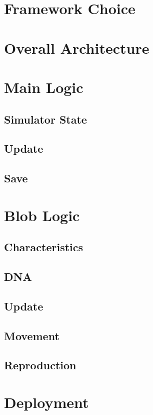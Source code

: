 \section{Framework Choice}
\section{Overall Architecture}
\section{Main Logic}
\subsection{Simulator State}
\subsection{Update}
\subsection{Save}
\section{Blob Logic}
\subsection{Characteristics}
\subsection{DNA}
\subsection{Update}
\subsection{Movement}
\subsection{Reproduction}
\section{Deployment}